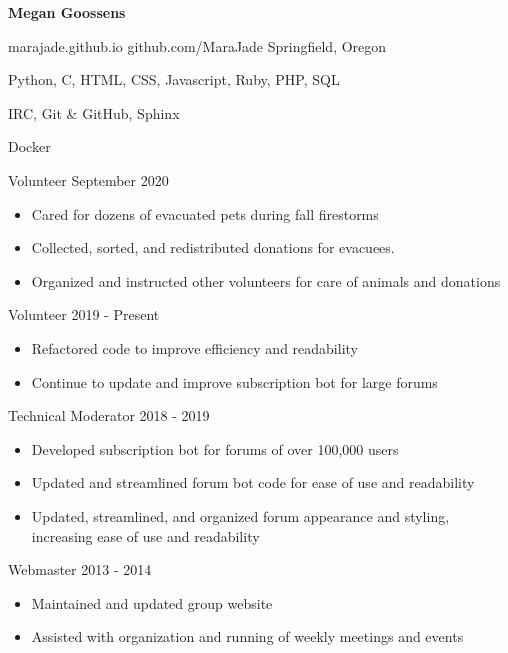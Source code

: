 \documentclass[11pt]{article} %
\begin{document}
\centerline{{\Huge \bf Megan Goossens}}
\bigskip


        {marajade.github.io}
        {github.com/MaraJade}
        {Springfield, Oregon}



      {Python, C, HTML, CSS, Javascript, Ruby, PHP, SQL}

      {IRC, Git \& GitHub, Sphinx}

      {Docker}


\begin{description}
\squish
{}
           {Volunteer}
           {September 2020}

\begin{itemize}
  \item Cared for dozens of evacuated pets during fall firestorms
  \item Collected, sorted, and redistributed donations for evacuees.
  \item Organized and instructed other volunteers for care of animals and
    donations
\end{itemize}


            {Volunteer}
            {2019 - Present}

\begin{itemize}
  \item Refactored code to improve efficiency and readability
  \item Continue to update and improve subscription bot for large forums
\end{itemize}


            {Technical Moderator}
            {2018 - 2019}

\begin{itemize}
  \item Developed subscription bot for forums of over 100,000 users
  \item Updated and streamlined forum bot code for ease of use and readability
  \item Updated, streamlined, and organized forum appearance and styling,
    increasing ease of use and readability
\end{itemize}

           {Webmaster}
           {2013 - 2014}

\begin{itemize}
  \item Maintained and updated group website
  \item Assisted with organization and running of weekly meetings and events
\end{itemize}


\end{description}
\end{document}
